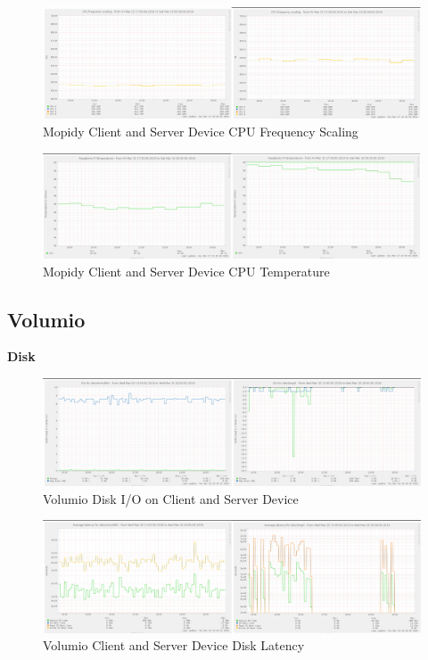 \documentclass[11pt,a4paper,headinclude=false,footinclude=false]{scrreprt}
\begin{document}
\begin{figure}[H]
\includegraphics{ResultsAndAnalysis/MopidyServerTestImages/002MopidyCPUFreqScaling.png}
\centering
\caption{Mopidy Client and Server Device CPU Frequency Scaling}
\label{MopidyCPUFreqScaling}
\end{figure}

\begin{figure}[H]
\includegraphics{ResultsAndAnalysis/MopidyServerTestImages/003MopidyCPUTemp.png}
\centering
\caption{Mopidy Client and Server Device CPU Temperature}
\label{MopidyCPUTemp}
\end{figure}

\subsection{Volumio}\label{volumio-2}

\textbf{Disk}

\begin{figure}[H]
\includegraphics{ResultsAndAnalysis/VolumioServerTestImages/005VolumioDiskIO.png}
\centering
\caption{Volumio Disk I/O on Client and Server Device}
\label{VolumioDiskIO}
\end{figure}

\begin{figure}[H]
\includegraphics{ResultsAndAnalysis/VolumioServerTestImages/006VolumioDiskLatency.png}
\centering
\caption{Volumio Client and Server Device Disk Latency}
\label{VolumioDiskLatency}
\end{figure}
\end{document}
